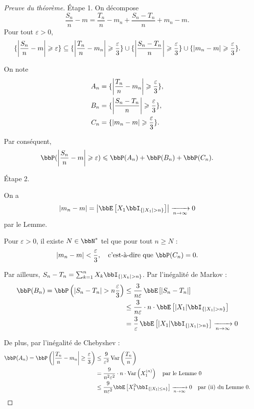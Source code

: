 \begin{proof}[Preuve du théorème]
    Étape 1.
    On décompose
    \[ \frac{S_n}{n} - m = \frac{T_n}{n} - m_n + \frac{S_n - T_n}{n} + m_n - m. \]
    Pour tout $\varepsilon > 0$,
    \[ \{ \left\lvert \frac{S_n}{n} - m \right\rvert \geqslant \varepsilon \}
        \subseteq \{ \left\lvert \frac{T_n}{n} - m_n \right\rvert \geqslant \frac{\varepsilon}{3} \}
        \cup \{ \left\lvert \frac{S_n - T_n}{n} \right\rvert \geqslant \frac{\varepsilon}{3} \}
        \cup \{ \left\lvert m_n - m \right\rvert \geqslant \frac{\varepsilon}{3} \}. \]

    On note
    \begin{align*}
        A_n & = \{ \left\lvert \frac{T_n}{n} - m_n \right\rvert \geqslant \frac{\varepsilon}{3} \}, \\
        B_n & = \{ \left\lvert \frac{S_n - T_n}{n} \right\rvert \geqslant \frac{\varepsilon}{3} \}, \\
        C_n & = \{ \left\lvert m_n - m \right\rvert \geqslant \frac{\varepsilon}{3} \}.
    \end{align*}

    Par conséquent,
    \[ \bbP(\lrvert{\frac{S_n}{n} - m} \geqslant \varepsilon) \leqslant \bbP(A_n) + \bbP(B_n) + \bbP(C_n). \]

    Étape 2.

    On a
    \[ |m_n - m| = \left| \bbE\left[ X_1 \bbI_{\{|X_1| > n\}} \right] \right| \xrightarrow[n \to \infty]{} 0 \]
    par le Lemme.

    Pour $\varepsilon > 0$, il existe $N \in \bbN^*$ tel que pour tout $n \ge N$ :
    \[ |m_n - m| < \frac{\varepsilon}{3}, \quad \text{c'est-à-dire que } \bbP(C_n) = 0. \]

    Par ailleurs, $S_n - T_n = \sum_{k=1}^{n} X_k \bbI_{\{|X_k| > n\}}$. Par l'inégalité de Markov :
    \begin{align*}
        \bbP(B_n) = \bbP\left(|S_n - T_n| > n \frac{\varepsilon}{3}\right)
         & \le \frac{3}{n\varepsilon} \, \bbE\left[ |S_n - T_n| \right]                                            \\
         & \le \frac{3}{n\varepsilon} \cdot n \cdot \bbE\left[ |X_1| \bbI_{\{|X_1| > n\}} \right]                  \\
         & = \frac{3}{\varepsilon} \, \bbE\left[ |X_1| \bbI_{\{|X_1| > n\}} \right] \xrightarrow[n \to \infty]{} 0
    \end{align*}

    De plus, par l'inégalité de Chebyshev :
    \begin{align*}
        \bbP(A_n) = \bbP\left( \left| \frac{T_n}{n} - m_n \right| \ge \frac{\varepsilon}{3} \right)
         & \le \frac{9}{\varepsilon^2} \var\left(\frac{T_n}{n}\right)                                                                                     \\
         & = \frac{9}{n^2 \varepsilon^2} \cdot n \cdot \var\left(X_1^{(n)}\right) \quad \text{par le Lemme 0}                                             \\
         & \le \frac{9}{n \varepsilon^2} \bbE\left[ X_1^2 \bbI_{\{|X_1| \le n\}} \right] \xrightarrow[n \to \infty]{} 0 \quad \text{par (ii) du Lemme 0.}
    \end{align*}


\end{proof}
